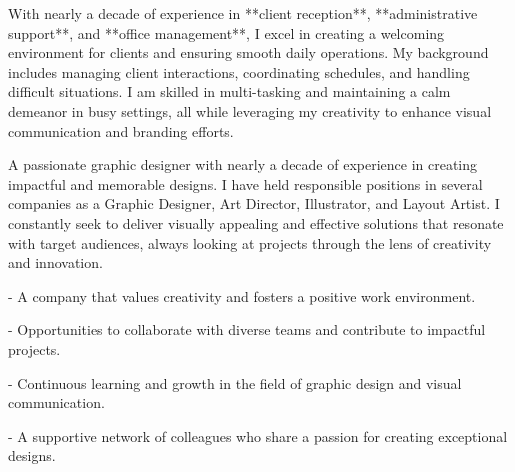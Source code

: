 \documentclass[10pt,a4paper,ragged2e,withhyper]{altacv}
\begin{document}



\makecvheader


\begin{raggedright}
With nearly a decade of experience in **client reception**, **administrative support**, and **office management**, I excel in creating a welcoming environment for clients and ensuring smooth daily operations. My background includes managing client interactions, coordinating schedules, and handling difficult situations. I am skilled in multi-tasking and maintaining a calm demeanor in busy settings, all while leveraging my creativity to enhance visual communication and branding efforts.
\end{raggedright}

\vspace{0.5cm}

\begin{paracol}{2}



    \begin{raggedright}
        A passionate graphic designer with nearly a decade of experience in creating impactful and memorable designs. I have held responsible positions in several companies as a Graphic Designer, Art Director, Illustrator, and Layout Artist.
        I constantly seek to deliver visually appealing and effective solutions that resonate with target audiences, always looking at projects through the lens of creativity and innovation.
    \end{raggedright}
    
    
    \switchcolumn
    
    
    \begin{raggedright}

        - A company that values creativity and fosters a positive work environment.
        
        - Opportunities to collaborate with diverse teams and contribute to impactful projects.
        
        - Continuous learning and growth in the field of graphic design and visual communication.
        
        - A supportive network of colleagues who share a passion for creating exceptional designs.
        
        
        \end{raggedright}

\end{paracol}
\end{document}
